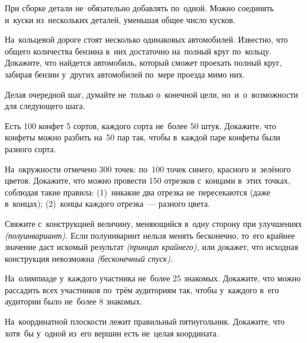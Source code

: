 При сборке детали не~обязательно добавлять по~одной.
Можно соединять и~куски из~нескольких деталей, уменьшая общее число кусков.

\begin{exercises}

\item
На~кольцевой дороге стоят несколько одинаковых автомобилей.
Известно, что общего количества бензина в~них достаточно на~полный круг
по~кольцу.
Докажите, что найдется автомобиль, который сможет проехать полный круг, забирая
бензин у~других автомобилей по~мере проезда мимо них.

\end{exercises}

Делая очередной шаг, думайте не~только о~конечной цели, но~и~о~возможности для
следующего шага.

\begin{exercises}

\item
Есть 100 конфет 5 сортов, каждого сорта не~более 50 штук.
Докажите, что конфеты можно разбить на~50 пар так, чтобы в~каждой паре конфеты
были разного сорта.

\item
На~окружности отмечено 300 точек: по~100 точек синего, красного и~зелёного
цветов.
Докажите, что можно провести 150 отрезков с~концами в~этих точках, соблюдая
такие правила:
(1)~никакие два отрезка не~пересекаются (даже в~концах);
(2)~концы каждого отрезка~--- разного цвета.

\end{exercises}

Свяжите с~конструкцией величину, меняющийся в~одну сторону при улучшениях
\emph{(полуинвариант).}
Если полуинваринт нельзя менять бесконечно, то~его крайнее значение даст
искомый результат \emph{(принцип крайнего),} или докажет, что исходная
конструкция невозможна \emph{(бесконечный спуск).}

\begin{exercises}

\item
На~олимпиаде у~каждого участника не~более 25 знакомых.
Докажите, что можно рассадить всех участников по~трём аудиториям так, чтобы
у~каждого в~его аудитории было не~более 8 знакомых.

\item
На~координатной плоскости лежит правильный пятиугольник.
Докажите, что хотя~бы у~одной из~его вершин есть не~целая координата.

\end{exercises}

